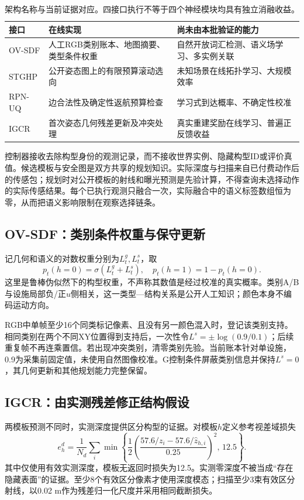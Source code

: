 \documentclass[11pt,a4paper]{article}
\begin{document}
\begin{table}[tb]
\centering\small
\caption{架构名称与当前证据对应。四接口执行不等于四个神经模块均具有独立消融收益。}
\label{tab:modules}
\begin{tabular}{p{.13\linewidth}p{.39\linewidth}p{.38\linewidth}}
\toprule
接口 & 在线实现 & 尚未由本批验证的能力\\\midrule
OV-SDF & 人工RGB类别账本、地图摘要、类型条件权重 & 自然开放词汇检测、语义场学习、多实例关联\\
STGHP & 公开姿态图上的有限预算滚动选向 & 未知场景在线拓扑学习、大规模效率\\
RPN-UQ & 边合法性及确定性返航预算检查 & 学习式到达概率、不确定性校准\\
IGCR & 首次姿态几何残差更新及冲突处理 & 真实重建奖励在线学习、普遍正反馈收益\\\bottomrule
\end{tabular}
\end{table}

控制器接收去除构型身份的观测记录，而不接收世界实例、隐藏构型ID或评价真值。候选模板与安全图是双方共享的规划知识。实际深度与扫描来自已付费动作后的传感包；规划时对公开模板的射线和曝光预测是先验计算，不得查询未选择动作的实际传感结果。每个已执行观测只融合一次，实际融合中的语义标签数组恒为零，从而把语义影响限制在观察选择链条。

\subsection{OV-SDF：类别条件权重与保守更新}
记几何和语义的对数权重分别为$L_t^g,L_t^s$，取
\begin{equation}
p_t(h=0)=\sigma(L_t^g+L_t^s),\quad p_t(h=1)=1-p_t(h=0).
\label{eq:belief}
\end{equation}
这里是鲁棒伪似然下的构型权重，不声称其数值是经过校准的真实概率。类别A/B与设施局部负/正$u$侧相关，这一类型—结构关系是公开人工知识；颜色本身不编码运动方向。

RGB中单帧至少16个同类标记像素、且没有另一颜色混入时，登记该类别支持。相同类别在两个不同XY位置得到支持后，一次性令$L^s=\pm\log(0.9/0.1)$；后续重复帧不再连乘置信。若出现冲突类别，清零类别先验。当前账本针对单设施，0.9为采集前固定值，未使用自然图像校准。G控制条件屏蔽类别信息并保持$L^s=0$，其几何更新和其他规划能力完整保留。

\subsection{IGCR：由实测残差修正结构假设}
两模板预测不同时，实测深度提供区分构型的证据。对模板$h$定义参考视差域损失
\begin{equation}
e_h^d=\frac{1}{N_d}\sum_i
\min\!\left\{\frac12\left(\frac{57.6/z_i-57.6/\widehat z_{h,i}}{0.25}\right)^2,\,12.5\right\}.
\label{eq:residual}
\end{equation}
其中仅使用有效实测深度，模板无返回时损失为12.5。实测零深度不被当成“存在隐藏表面”的证据。至少8个有效区分像素才使用深度模态；扫描至少3束有效区分射线，以0.02 m作为残差归一化尺度并采用相同截断损失。
\end{document}
